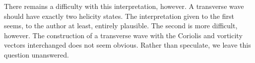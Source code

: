 \documentclass[10pt, fleqn,final,showtrims,oldfontcommands]{article} %
\newcommand{\eqnref}[1]{\ref{eqn:#1}}
\newcommand{\figref}[1]{Figure~\ref{fig:#1}}
\newcommand{\del}{\nabla}
\newcommand{\vdel}{ \mbox{\boldmath $\del$}}
\newcommand{\vE}{\vect E}
\newcommand{\vB}{\vect B}
\newcommand{\vect}[1]{\mathbf{#1}}
\begin{document}
There remains a difficulty with this interpretation, however.
A transverse wave should have exactly two helicity states.
The interpretation given to the first seems, to the author at least, entirely plausible.
The second is more difficult, however.
The construction of a transverse wave with the Coriolis and vorticity vectors interchanged does not seem obvious.
Rather than speculate, 
we leave this question unanswered.









 


\end{document}
